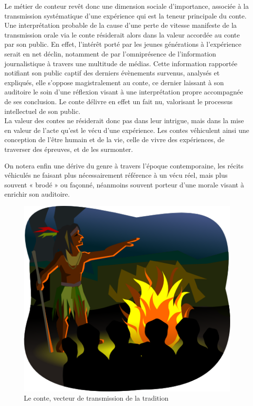 Le métier de conteur revêt donc une dimension sociale d'importance, associée à la transmission systématique d'une expérience qui est la teneur principale du conte. Une interprétation probable de la cause d'une perte de vitesse manifeste de la transmission orale via le conte résiderait alors dans la valeur accordée au conte par son public. En effet, l'intérêt porté par les jeunes générations à l'expérience serait en net déclin, notamment de par l'omniprésence de l'information journalistique à travers une multitude de médias. Cette information rapportée notifiant son public captif des derniers évènements survenus, analysés et expliqués, elle s'oppose magistralement au conte, ce dernier laissant à son auditoire le soin d'une réflexion visant à une interprétation propre accompagnée de ses conclusion. Le conte délivre en effet un fait nu, valorisant le processus intellectuel de son public.\\

La valeur des contes ne résiderait donc pas dans leur intrigue, mais dans la mise en valeur de l'acte qu'est le vécu d'une expérience. Les contes véhiculent ainsi une conception de l'être humain et de la vie, celle de vivre des expériences, de traverser des épreuves, et de les surmonter.

On notera enfin une dérive du genre à travers l'époque contemporaine, les récits véhiculés ne faisant plus nécessairement référence à un vécu réel, mais plus souvent « brodé » ou façonné, néanmoins souvent porteur d'une morale visant à enrichir son auditoire.\\

\begin{figure}[h!]
    \centering
    \includegraphics[width=0.80\linewidth]{img/storyteller.png}
    \caption{Le conte, vecteur de transmission de la tradition}
\end{figure}

